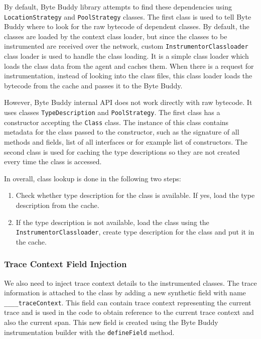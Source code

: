 By default, Byte Buddy library attempts to find these dependencies using  \texttt{LocationStrategy} and \texttt{PoolStrategy} classes. The first class is used to tell Byte Buddy where to look for the raw bytecode of dependent classes. By default, the classes are loaded by the context class loader, but since the classes to be instrumented are received over the network, custom \texttt{InstrumentorClassloader} class loader is used to handle the class loading. It is a simple class loader which loads the class data from the agent and caches them. When there is a request for instrumentation, instead of looking into the class files, this class loader loads the bytecode from the cache and passes it to the Byte Buddy.

However, Byte Buddy internal API does not work directly with raw bytecode. It uses classes \texttt{TypeDescription} and \texttt{PoolStrategy}. The first class has a constructor accepting the \texttt{Class} class. The  instance of this class contains metadata for the class passed to the constructor, such as the signature of all methods and fields, list of all interfaces or for example list of constructors. The second class is used for caching the type descriptions so they are not created every time the class is accessed. 

In overall, class lookup is done in the following two steps:
\begin{enumerate}
	\item Check whether type description for the class is available. If yes, load the type description from the cache.
	\item If the type description is not available, load the class using the \linebreak \texttt{InstrumentorClassloader}, create type description for the class and put it in the cache.
\end{enumerate}

\subsubsection{Trace Context Field Injection}
We also need to inject trace context details to the instrumented classes. The trace information is attached to the class by adding a new synthetic field with name \texttt{\_\_\_\_traceContext}. This field can contain trace context representing the current trace and is used in the code to obtain reference to the current trace context and also the current span. This new field is created using the Byte Buddy instrumentation builder with the \texttt{defineField} method.

